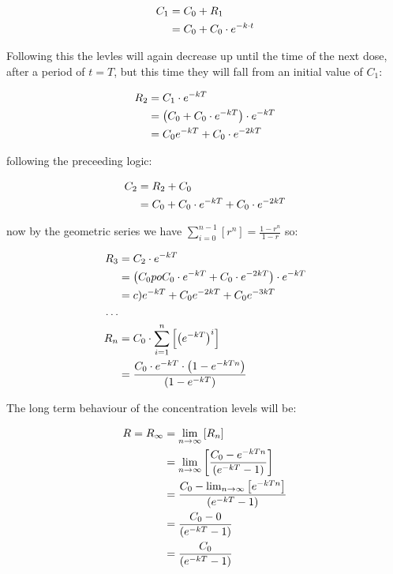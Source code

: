 \begin{align}
C_1&= C_0+ R_1 \notag \\ 
&= C_0+ C_0\cdot  e^{-k\cdot  t}
\end{align}

Following this the levles will again decrease up until the time of the next dose, after a period of $t= T$, but this time they will fall from an initial value of $C_1$:

\begin{align}
  R_2&= C_1\cdot  e^{- kT}\notag \\ 
  &= \left( C_0 +  C_0\cdot  e^{- kT} \right)\cdot  e^{- kT}\notag \\ 
  &= C_0e^{- kT} +  C_0\cdot  e^{- 2kT}
\end{align}


following the preceeding logic:

\begin{align}
C_2 &=  R_2 +  C_0 \notag \\ 
&= C_0 +  C_0 \cdot  e^{- kT} +  C_0 \cdot   e^{- 2kT}
\end{align}

now by the geometric series we have $\sum^{n- 1}_{i= 0}   \left[ r^n \right]= \frac{1- r^n}{1- r}$ so:

\begin{align}
R_3 &=  C_2 \cdot  e^{- kT}\notag \\ 
&=  \left( C_0 po C_0 \cdot  e^{- kT} +  C_0 \cdot  e^{- 2kT} \right) \cdot   e^{- kT}\notag \\ 
&= c)e^{- kT} +  C_0 e^{- 2kT} +  C_0 e^{- 3kT}\notag \\ 
\dots \notag \\ 
R_n &= C_0\cdot  \sum^{n}_{i= 1}   \left[ \left( e^{- kT} \right)^i \right] \notag\\
&= \frac{C_0\cdot  e^{- kT} \cdot  \left( 1- e^{- kTn} \right)}{\left( 1- e^{- kT} \right)}
\end{align}


The long term behaviour of the concentration levels will be:

\begin{align}
  R= R_{\infty} &= \lim_{n     \rightarrow \infty}\left[ R_n \right]\notag \\ 
&= \lim_{n     \rightarrow \infty}\left[ \frac{C_0 - e^{- kTn}}{\left( e^{- kT} - 1\right)} \right]\notag \\ 
&=  \frac{C_0 - \lim_{n     \rightarrow \infty}\left[ e^{- kTn} \right]}{\left( e^{- kT} - 1\right)} \notag\\
&=  \frac{C_0 - 0}{\left( e^{- kT} - 1\right)} \notag \\
&=  \frac{C_0 }{\left( e^{- kT} - 1\right)} 
\end{align}

